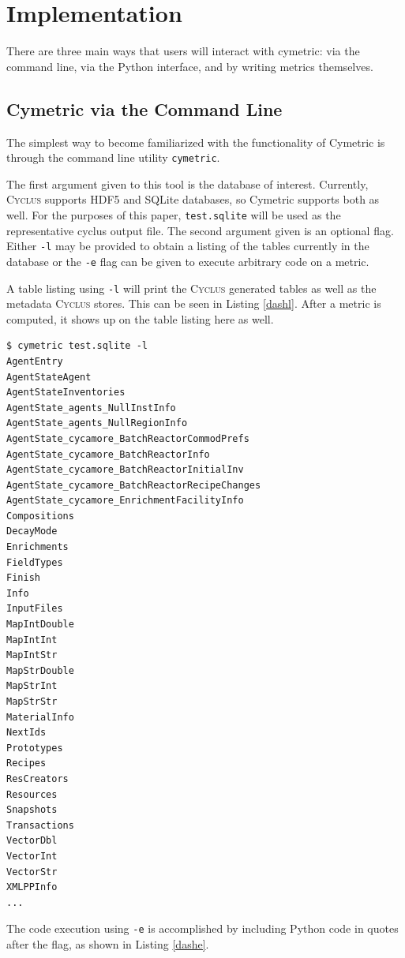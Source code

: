 \documentclass{anstrans}
\newcommand{\cyclus}{\textsc{Cyclus}\xspace}
\newcommand{\code}[1]{{\color{code}\texttt{#1}}}
\begin{document}
\section{Implementation}

There are three main ways that users will interact with cymetric: 
via the command line, via the Python interface, and by writing metrics 
themselves.

\subsection{Cymetric via the Command Line}
The simplest way to become familiarized with the functionality of Cymetric 
is through the command line utility \code{cymetric}. 

The first argument given to this tool is the database of interest. 
Currently, \cyclus supports \gls{HDF5} \cite{folk2011overview} and \gls{SQLite} \cite{owens2006definitive} databases, 
so Cymetric supports both as well. For the purposes of this paper, 
\code{test.sqlite} will be used as the representative cyclus output file. 
The second 
argument given is an optional flag. Either \code{-l} may be provided to obtain 
a listing of the tables currently in the database or the \code{-e} flag 
can be given to execute arbitrary code on a metric. 

A table listing using \code{-l} will print the \cyclus generated tables 
as well as the metadata \cyclus stores. This can be seen in Listing 
\ref{dashl}. After a metric is computed, it shows up on the table 
listing here as well. 

\begin{lstlisting}[caption ={List of Tables in a Database}, label=dashl]
$ cymetric test.sqlite -l
AgentEntry
AgentStateAgent
AgentStateInventories
AgentState_agents_NullInstInfo
AgentState_agents_NullRegionInfo
AgentState_cycamore_BatchReactorCommodPrefs
AgentState_cycamore_BatchReactorInfo
AgentState_cycamore_BatchReactorInitialInv
AgentState_cycamore_BatchReactorRecipeChanges
AgentState_cycamore_EnrichmentFacilityInfo
Compositions
DecayMode
Enrichments
FieldTypes
Finish
Info
InputFiles
MapIntDouble
MapIntInt
MapIntStr
MapStrDouble
MapStrInt
MapStrStr
MaterialInfo
NextIds
Prototypes
Recipes
ResCreators
Resources
Snapshots
Transactions
VectorDbl
VectorInt
VectorStr
XMLPPInfo
...
\end{lstlisting} 

The code execution using \code{-e} is accomplished by including 
Python code in quotes after the flag, as shown in Listing \ref{dashe}. 
\end{document}
